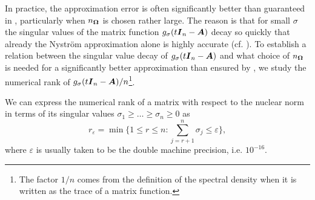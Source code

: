 In practice, the approximation error is often significantly better than guaranteed in , particularly when $n_{\boldsymbol{\Omega}}$ is chosen rather large. The reason is that for small $\sigma$ the singular values of the matrix function $g_{\sigma}(t\boldsymbol{I}_n - \boldsymbol{A})$ decay so quickly that already the Nyström approximation alone is highly accurate (cf. ). To establish a relation between the singular value decay of $g_{\sigma}(t\boldsymbol{I}_n - \boldsymbol{A})$ and what choice of $n_{\boldsymbol{\Omega}}$ is needed for a significantly better approximation than ensured by , we study the numerical rank of $g_{\sigma}(t\boldsymbol{I}_n - \boldsymbol{A}) / n$\footnote{The factor $1/n$ comes from the definition of the spectral density  when it is written as the trace of a matrix function.}.

We can express the numerical rank of a matrix with respect to the nuclear norm in terms of its singular values $\sigma_1 \geq \dots \geq \sigma_n \geq 0$ as
\begin{equation}
    r_{\varepsilon} = \min \{1 \leq r \leq n: \sum_{j=r+1}^n \sigma_{j} \leq \varepsilon \},
    \label{equ:numerical-rank}
\end{equation}
where $\varepsilon$ is usually taken to be the double machine precision, i.e. $10^{-16}$. 

%

